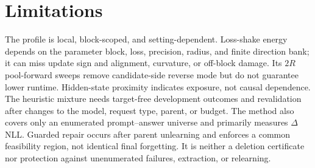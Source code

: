\section{Limitations}
\label{sec:limitations}

The profile is local, block-scoped, and setting-dependent. Loss-shake energy
depends on the parameter block, loss, precision, radius, and finite direction
bank; it can miss update sign and alignment, curvature, or off-block damage.
Its $2R$ pool-forward sweeps remove candidate-side reverse mode but do not
guarantee lower runtime. Hidden-state proximity indicates exposure, not
causal dependence. The heuristic mixture needs target-free development
outcomes and revalidation after changes to the model, request type, parent,
or budget. The method also covers only an enumerated prompt--answer universe
and primarily measures $\Delta$NLL. Guarded repair occurs after parent
unlearning and enforces a common feasibility region, not identical final
forgetting. It is neither a deletion certificate nor protection against
unenumerated failures, extraction, or relearning.
